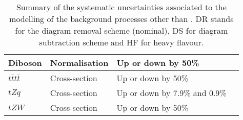 \begin{table}[htbp]
\begin{tabular}{llll}
  Diboson     & Normalisation & Up or down by 50\% \\
  \midrule
  $t\bar{t}t\bar{t}$  & Cross-section &  Up or down by 50\% \\
  $tZq$  & Cross-section &  Up or down by 7.9\% and 0.9\% \\
  $tZW$  & Cross-section &  Up or down by 50\% \\
  \bottomrule\bottomrule
  \end{tabular}
  \caption{
    Summary of the systematic uncertainties associated to the modelling of the background processes
    other than \ttbar. DR stands for the diagram removal scheme (nominal), DS for diagram subtraction scheme and HF for heavy flavour.
  }
  \label{Hplustb:tablesysalt}
\end{table}